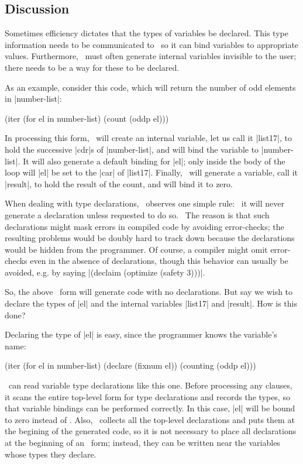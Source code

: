 \subsection{Discussion}

Sometimes efficiency dictates that the types of variables be declared.
This type information needs to be communicated to \iter\ so it can
bind variables to appropriate values.  Furthermore, \iter\ must often
generate internal variables invisible to the user; there needs to be a
way for these to be declared.

As an example, consider this code, which will return the number of
odd elements in |number-list|:
\begin{program}
(iter (for el in number-list)
      (count (oddp el)))
\end{program}
In processing this form,
\iter\ will create an internal variable, let us call it |list17|, to
hold the successive |cdr|s of |number-list|, and  
will bind the variable to |number-list|.  It will also generate a
default binding for |el|; only inside the body of the loop will |el|
be set to the |car| of |list17|.  Finally, \iter\ will generate a
variable, call it |result|, to hold the result of the count, and will
bind it to zero.

When dealing with type declarations, \iter\ observes one simple rule:
~it will never generate a declaration unless requested to do so.~  The
reason is that such declarations might mask errors in compiled code by
avoiding error-checks; the resulting problems would be doubly hard to
track down because the declarations would be hidden from the
programmer.  Of course, a compiler might omit error-checks even in the
absence of declarations, though this behavior can usually be avoided,
e.g. by saying |(declaim (optimize (safety 3)))|.

So, the above \iter\ form will generate code with no declarations.
But say we wish to declare the types of |el| and the internal
variables |list17| and |result|.  How is this done?

Declaring the type of |el| is easy, since the programmer knows
the variable's name:
\begin{program}
(iter (for el in number-list)
      (declare (fixnum el))
      (counting (oddp el)))
\end{program}
\iter\ can read variable type declarations like this one.  Before
processing any clauses, it scans the entire top-level form for type
declarations 
and records the types, so that variable bindings can be performed
correctly.  In this case, |el| will be bound to zero
instead of \nil.  Also, \iter\ collects all the top-level declarations
and puts them at the begining of the generated code, so it is not
necessary to place all declarations at the beginning of an \iter\
form; instead, they can be written near the variables whose types they
declare.  

